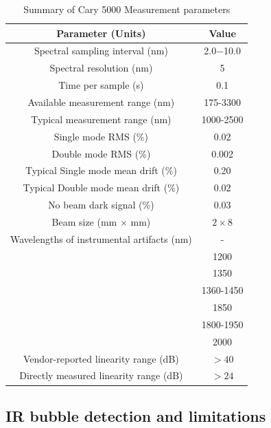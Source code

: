 \documentclass[osajnl,preprint,showpacs,superscriptaddress,12pt]{revtex4-1} %
\begin{document}
\begin{table}[h!]
\caption{Summary of Cary 5000 Measurement parameters \label{tab:Cary5000pars}}
\begin{center}
\begin{tabular}{ c c }
\hline
        Parameter (Units) & Value \\ 
\hline
        Spectral sampling interval (nm) & 2.0$-$10.0 \\
        Spectral resolution (nm) & 5 \\
        Time per sample (s) & 0.1 \\
        Available measurement range (nm) & 175-3300 \\
        Typical measurement range (nm) & 1000-2500 \\
	Single mode RMS  (\%) & 0.02 \\
	Double mode RMS  (\%) & 0.002 \\
	Typical Single mode mean drift (\%) & 0.20 \\
	Typical Double mode mean drift (\%) & 0.02 \\
	No beam dark signal (\%) & 0.03 \\
 	Beam size (mm $\times$ mm) & $2 \times 8$ \\
	Wavelengths of instrumental artifacts (nm) & - \\
        		 & 1200 \\
		 & 1350 \\
		 & 1360-1450\\
		 & 1850 \\
		 & 1800-1950 \\
		 & 2000 \\
        Vendor-reported linearity range (dB) & $>40$ \\
        Directly measured linearity range (dB) & $>24$ \\
    \hline
    \end{tabular}
\end{center}
\end{table}


\subsection{IR bubble detection and limitations}
\end{document}
